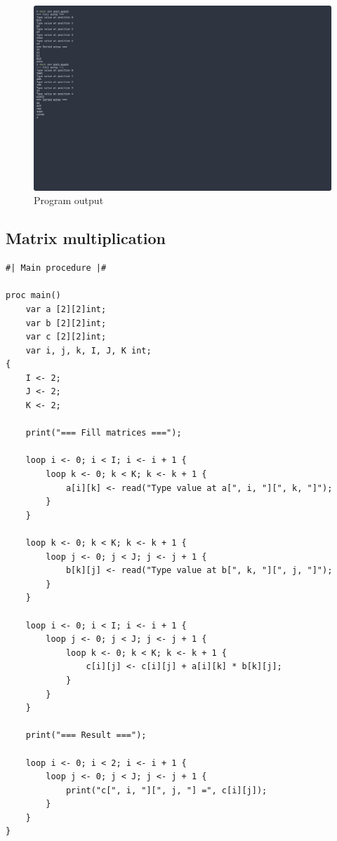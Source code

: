 \begin{figure}[H]
    \centering
    \caption{Program output}
    \includegraphics[width=\textwidth]{evidences/sort_output}
\end{figure}

\newpage

\subsection{Matrix multiplication}

\begin{verbatim}
#| Main procedure |#

proc main()
    var a [2][2]int;
    var b [2][2]int;
    var c [2][2]int;
    var i, j, k, I, J, K int;
{
    I <- 2;
    J <- 2;
    K <- 2;

    print("=== Fill matrices ===");

    loop i <- 0; i < I; i <- i + 1 {
        loop k <- 0; k < K; k <- k + 1 {
            a[i][k] <- read("Type value at a[", i, "][", k, "]");
        }
    }

    loop k <- 0; k < K; k <- k + 1 {
        loop j <- 0; j < J; j <- j + 1 {
            b[k][j] <- read("Type value at b[", k, "][", j, "]");
        }
    }

    loop i <- 0; i < I; i <- i + 1 {
        loop j <- 0; j < J; j <- j + 1 {
            loop k <- 0; k < K; k <- k + 1 {
                c[i][j] <- c[i][j] + a[i][k] * b[k][j];
            }
        }
    }

    print("=== Result ===");

    loop i <- 0; i < 2; i <- i + 1 {
        loop j <- 0; j < J; j <- j + 1 {
            print("c[", i, "][", j, "] =", c[i][j]);
        }
    }
}
\end{verbatim}

